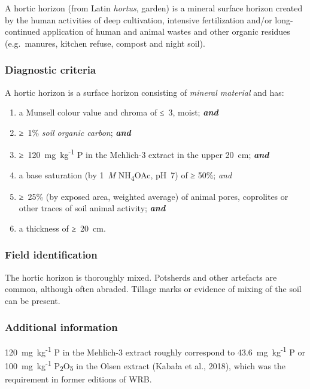 \documentclass[
  letterpaper,
  DIV=11,
  numbers=noendperiod]{scrreprt}
\providecommand{\tightlist}{%
  \setlength{\itemsep}{0pt}\setlength{\parskip}{0pt}}\usepackage{longtable,booktabs,array}
\begin{document}
A hortic horizon (from Latin \emph{hortus}, garden) is a mineral surface
horizon created by the human activities of deep cultivation, intensive
fertilization and/or long-continued application of human and animal
wastes and other organic residues (e.g.~manures, kitchen refuse, compost
and night soil).

\hypertarget{diagnostic-criteria-15}{%
\subsubsection{Diagnostic criteria}\label{diagnostic-criteria-15}}

A hortic horizon is a surface horizon consisting of \emph{mineral
material} and has:

\begin{enumerate}
\def\labelenumi{\arabic{enumi}.}
\tightlist
\item
  a Munsell colour value and chroma of ≤~3, moist; \textbf{\emph{and}}
\item
  ≥~1\% \emph{soil organic carbon}; \textbf{\emph{and}}
\item
  ≥~120~mg~kg\textsuperscript{-1} P in the Mehlich-3 extract in the
  upper 20~cm; \textbf{\emph{and}}
\item
  a base saturation (by 1~\emph{M} NH\textsubscript{4}OAc, pH~7) of ≥
  50\%; \emph{and}
\item
  ≥~25\% (by exposed area, weighted average) of animal pores, coprolites
  or other traces of soil animal activity; \textbf{\emph{and}}
\item
  a thickness of ≥~20~cm.
\end{enumerate}

\hypertarget{field-identification-10}{%
\subsubsection{Field identification}\label{field-identification-10}}

The hortic horizon is thoroughly mixed. Potsherds and other artefacts
are common, although often abraded. Tillage marks or evidence of mixing
of the soil can be present.

\hypertarget{additional-information-8}{%
\subsubsection{Additional information}\label{additional-information-8}}

120~mg~kg\textsuperscript{-1} P in the Mehlich-3 extract roughly
correspond to 43.6~mg~kg\textsuperscript{-1} P or
100~mg~kg\textsuperscript{-1} P\textsubscript{2}O\textsubscript{5} in
the Olsen extract (Kabała et al., 2018), which was the requirement in
former editions of WRB.
\end{document}
